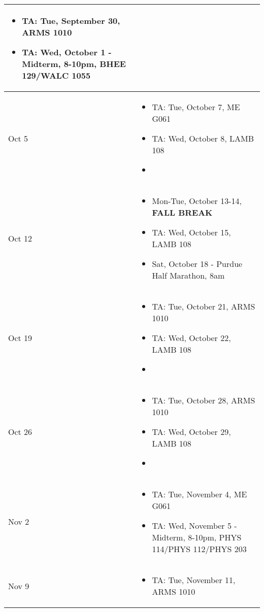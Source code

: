 \documentclass{article}
\begin{document}
\begin{center}
\begin{xltabular}{\linewidth}{ s | M }
\begin{itemize}
    \item TA: Tue, September 30, ARMS 1010
    \item TA: Wed, October 1 - Midterm, 8-10pm, BHEE 129/WALC 1055
\end{itemize}
\\
\hline
Oct 5 	&
\begin{itemize}
    \item TA: Tue, October 7, ME G061
    \item TA: Wed, October 8, LAMB 108
    \item
\end{itemize}
\\
\hline
Oct 12 	&
\begin{itemize}
    \item Mon-Tue, October 13-14, \textbf{FALL BREAK}
    \item TA: Wed, October 15, LAMB 108
    \item Sat, October 18 - Purdue Half Marathon, 8am
\end{itemize}
\\
\hline
Oct 19 	&
\begin{itemize}
    \item TA: Tue, October 21, ARMS 1010
    \item TA: Wed, October 22, LAMB 108
    \item
\end{itemize}
\\
\hline
Oct 26 	&
\begin{itemize}
    \item TA: Tue, October 28, ARMS 1010
    \item TA: Wed, October 29, LAMB 108
    \item
\end{itemize}
\\
\hline
Nov 2 	&
\begin{itemize}
    \item TA: Tue, November 4, ME G061
    \item TA: Wed, November 5 - Midterm, 8-10pm, PHYS 114/PHYS 112/PHYS 203
\end{itemize}
\\
\hline
Nov 9 	&
\begin{itemize}
    \item TA: Tue, November 11, ARMS 1010

\end{itemize}
\end{xltabular}
\end{center}
\end{document}
